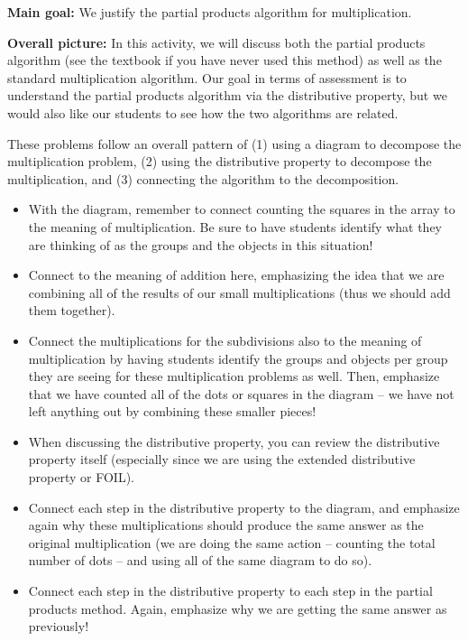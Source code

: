 \documentclass[nooutcomes,noauthor]{ximera}
\begin{document}
\begin{instructorNotes} 



{\bf Main goal:} We justify the partial products algorithm for multiplication.


{\bf Overall picture:} In this activity, we will discuss both the partial products algorithm (see the textbook if you have never used this method) as well as the standard multiplication algorithm. Our goal in terms of assessment is to understand the partial products algorithm via the distributive property, but we would also like our students to see how the two algorithms are related.


These problems follow an overall pattern of (1) using a diagram to decompose the multiplication problem, (2) using the distributive property to decompose the multiplication, and (3) connecting the algorithm to the decomposition. 
\begin{itemize}
	\item With the diagram, remember to connect counting the squares in the array to the meaning of multiplication. Be sure to have students identify what they are thinking of as the groups and the objects in this situation!
	\item Connect to the meaning of addition here, emphasizing the idea that we are combining all of the results of our small multiplications (thus we should add them together).
	\item Connect the multiplications for the subdivisions also to the meaning of multiplication by having students identify the groups and objects per group they are seeing for these multiplication problems as well. Then, emphasize that we have counted all of the dots or squares in the diagram -- we have not left anything out by combining these smaller pieces!
	\item When discussing the distributive property, you can review the distributive property itself (especially since we are using the extended distributive property or FOIL).
	\item Connect each step in the distributive property to the diagram, and emphasize again why these multiplications should produce the same answer as the original multiplication (we are doing the same action -- counting the total number of dots -- and using all of the same diagram to do so).
	\item Connect each step in the distributive property to each step in the partial products method. Again, emphasize why we are getting the same answer as previously!

\end{itemize}
\end{instructorNotes}
\end{document}
